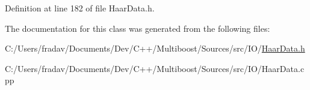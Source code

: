 Definition at line 182 of file Haar\-Data.\-h.



The documentation for this class was generated from the following files\-:\begin{DoxyCompactItemize}
\item 
C\-:/\-Users/fradav/\-Documents/\-Dev/\-C++/\-Multiboost/\-Sources/src/\-I\-O/\hyperlink{HaarData_8h}{Haar\-Data.\-h}\item 
C\-:/\-Users/fradav/\-Documents/\-Dev/\-C++/\-Multiboost/\-Sources/src/\-I\-O/Haar\-Data.\-cpp\end{DoxyCompactItemize}
